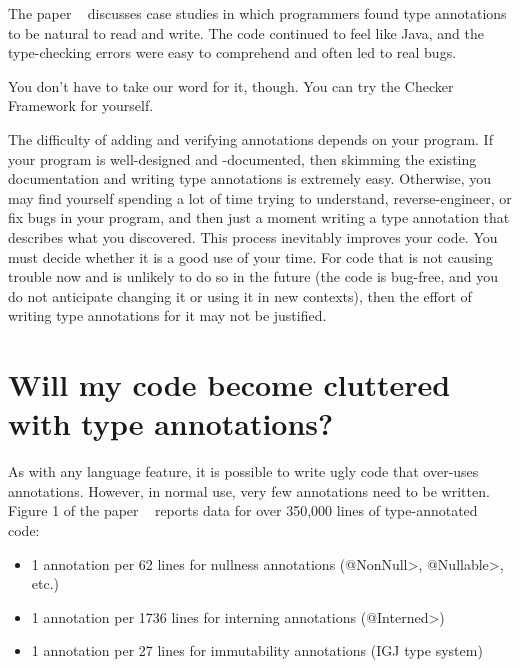 The paper
~\cite{PapiACPE2008} discusses case studies in
which programmers
found type annotations to be natural to read and write.  The code
continued to feel like Java, and the type-checking errors were easy to
comprehend and often led to real bugs.

You don't have to take our word for it, though.  You can try the
Checker Framework for yourself.

The difficulty of adding and verifying annotations depends on your program.
If your program is well-designed and -documented, then skimming the
existing documentation and writing type annotations is extremely easy.
Otherwise, you may find yourself spending a lot of time trying to
understand, reverse-engineer, or fix bugs in your program, and then just a
moment writing a type annotation that describes what you discovered.  This
process inevitably improves your code.  You must decide whether it is a
good use of your time.  For code that is not causing trouble now and is
unlikely to do so in the future (the code is bug-free, and you do not
anticipate changing it or using it in new contexts), then the
effort of writing type annotations for it may not be justified.


\section{Will my code become cluttered with type annotations?\label{faq-code-clutter}}

As with any language feature, it is possible to write ugly code that
over-uses annotations.  However, in normal use, very few annotations need
to be written.  Figure 1 of the paper
~\cite{PapiACPE2008} reports data for over
350,000 lines of type-annotated code:

\begin{itemize}
\item
    1 annotation per 62 lines for nullness annotations (\<@NonNull>, \<@Nullable>, etc.)
\item
    1 annotation per 1736 lines for interning annotations (\<@Interned>)
\item
    1 annotation per 27 lines for immutability annotations (IGJ type system)
\end{itemize}

